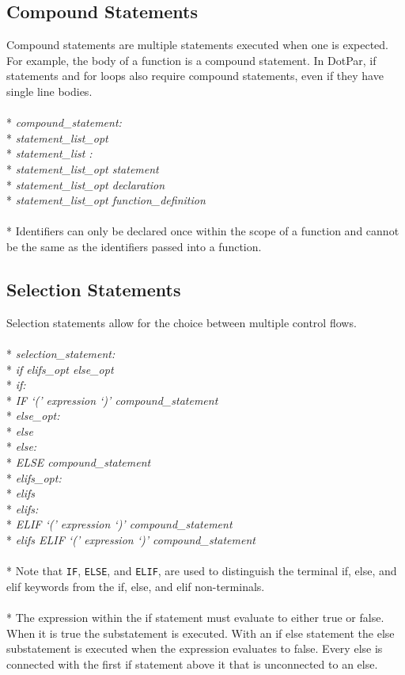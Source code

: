\subsection{Compound Statements}
Compound statements are multiple statements executed when one is expected. For example, the body of a function is a compound statement. In DotPar, if statements and for loops also require compound statements, even if they have single line bodies.
\\ \\* \tab \emph{compound\_statement:}
\\* \tab \tab \emph{{ statement\_list\_opt }}
\\* \tab \emph{statement\_list :}
\\* \tab \tab \emph{statement\_list\_opt statement}
\\* \tab \tab \emph{statement\_list\_opt declaration}
\\* \tab \tab \emph{statement\_list\_opt function\_definition}
\\ \\* Identifiers can only be declared once within the scope of a function and cannot be the same as the identifiers passed into a function.

\subsection{Selection Statements}
Selection statements allow for the choice between multiple control flows.
\\ \\* \tab \emph{selection\_statement: }
\\* \tab \tab \emph{if elifs\_opt else\_opt}
\\* \tab \emph{if:}
\\* \tab \tab \emph{IF `(' expression `)' compound\_statement}
\\* \tab \emph{else\_opt:}
\\* \tab \tab \emph{else}
\\* \tab \emph{else:}
\\* \tab \tab \emph{ELSE compound\_statement}
\\* \tab \emph{elifs\_opt:}
\\* \tab \tab \emph{elifs}
\\* \tab \emph{elifs:}
\\* \tab \tab \emph{ELIF `(' expression `)' compound\_statement}
\\* \tab \tab \emph{elifs ELIF `(' expression `)' compound\_statement}
\\ \\* Note that \verb!IF!, \verb!ELSE!, and \verb!ELIF!, are used to distinguish the terminal if, else, and elif keywords from the if, else, and elif non-terminals.
\\ \\* The expression within the if statement must evaluate to either true or false. When it is true the substatement is executed. With an if else statement the else substatement is executed when the expression evaluates to false. Every else is connected with the first if statement above it that is unconnected to an else.

